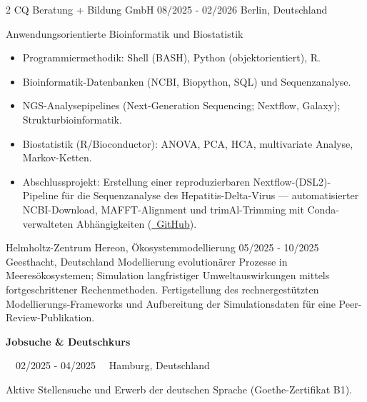 \documentclass{thejus_cv}
\begin{document}
\begin{paracol}{2}
             {CQ Beratung + Bildung GmbH}
             {08/2025 - 02/2026}
             {Berlin, Deutschland}
             {Anwendungsorientierte Bioinformatik und Biostatistik
             \begin{itemize}\setlength{\itemsep}{0.05em}
                 \item Programmiermethodik: Shell (BASH), Python (objektorientiert), R.
                 \item Bioinformatik-Datenbanken (NCBI, Biopython, SQL) und Sequenzanalyse.
                 \item NGS-Analysepipelines (Next-Generation Sequencing; Nextflow, Galaxy); Strukturbioinformatik.
                 \item Biostatistik (R/Bioconductor): ANOVA, PCA, HCA, multivariate Analyse, Markov-Ketten.
                 \item Abschlussprojekt: Erstellung einer reproduzierbaren Nextflow-(DSL2)-Pipeline f\"ur die Sequenzanalyse des Hepatitis-Delta-Virus --- automatisierter NCBI-Download, MAFFT-Alignment und trimAl-Trimming mit Conda-verwalteten Abh\"angigkeiten (\href{https://github.com/thejusmahajan/hepatitis-delta-pipeline}{\faGithub\ GitHub}).
             \end{itemize}}

             {Helmholtz-Zentrum Hereon, \"Okosystemmodellierung}
             {05/2025 - 10/2025}
             {Geesthacht, Deutschland}
             {Modellierung evolution\"arer Prozesse in Meeres\"okosystemen; Simulation langfristiger Umweltauswirkungen mittels fortgeschrittener Rechenmethoden. Fertigstellung des rechnergest\"utzten Modellierungs-Frameworks und Aufbereitung der Simulationsdaten f\"ur eine Peer-Review-Publikation.}

{\large\textbf{Jobsuche \& Deutschkurs}}\par
{\small\color{cvgray}\faCalendar\ \ 02/2025 - 04/2025 \hspace{0.5cm} \faMapMarker\ \ Hamburg, Deutschland}\par
\vspace{0.2em}
{\color{cvlightgray}\hdashrule{\linewidth}{0.5pt}{1mm}}\par
\vspace{0.2em}
Aktive Stellensuche und Erwerb der deutschen Sprache (Goethe-Zertifikat B1).
\vspace{0.3em}


\end{paracol}
\end{document}
